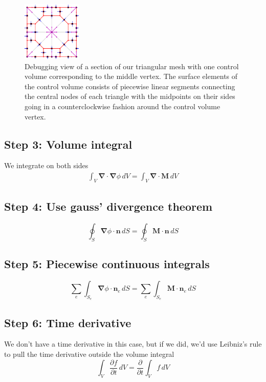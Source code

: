 \documentclass[acmtog]{acmart}
\begin{document}
\begin{figure}
  \centering
  \includegraphics[width=0.25\textwidth]{Images/cv1.png}
  \caption{Debugging view of a section of our triangular mesh with one control volume corresponding to the middle vertex. The surface elements of the control volume consists of piecewise linear segments connecting the central nodes of each triangle with the midpoints on their sides going in a counterclockwise fashion around the control volume vertex.\label{fig:cv1}}
\end{figure}

\subsection*{Step 3: Volume integral}
We integrate on both sides
%
\begin{align}
  \int_V \boldsymbol \nabla \cdot \boldsymbol \nabla \phi \, dV = \int_V \boldsymbol \nabla \cdot \boldsymbol M \, dV
\end{align}
%

\subsection*{Step 4: Use gauss' divergence theorem}
%
\begin{equation}
  \oint_S \boldsymbol \nabla \phi \cdot \boldsymbol n  \, d S = \oint_S \boldsymbol M \cdot \boldsymbol n \, d S
\end{equation}
%

\subsection*{Step 5: Piecewise continuous integrals}
%
\begin{equation}
  \sum_e \int_{S_e} \boldsymbol \nabla \phi \cdot \boldsymbol n_e \, d S = \sum_e \int_{S_e} \boldsymbol M \cdot \boldsymbol n_e \, d S
\end{equation}
%

\subsection*{Step 6: Time derivative}
We don't have a time derivative in this case, but if we did, we'd use Leibniz's rule to pull the time derivative outside the volume integral
%
\begin{equation}
  \int_V \frac{ \partial f }{ \partial t }  \, dV = \frac{ \partial  }{ \partial t} \int_V f \, dV
\end{equation}
%
\end{document}
